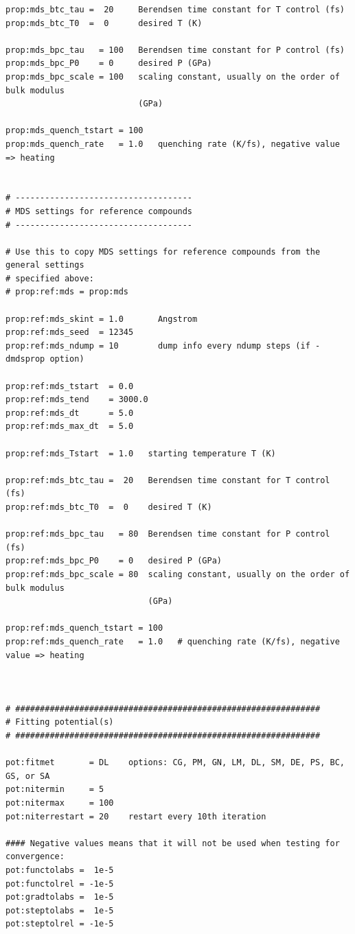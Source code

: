 \documentclass[a4paper,12pt,pdftex,onecolumn]{article}
\begin{document}
\begin{Verbatim}[fontsize=\relsize{-1},frame=single]
prop:mds_btc_tau =  20     Berendsen time constant for T control (fs)
prop:mds_btc_T0  =  0      desired T (K)

prop:mds_bpc_tau   = 100   Berendsen time constant for P control (fs)
prop:mds_bpc_P0    = 0     desired P (GPa)
prop:mds_bpc_scale = 100   scaling constant, usually on the order of bulk modulus
                           (GPa)

prop:mds_quench_tstart = 100
prop:mds_quench_rate   = 1.0   quenching rate (K/fs), negative value => heating


# ------------------------------------
# MDS settings for reference compounds
# ------------------------------------

# Use this to copy MDS settings for reference compounds from the general settings
# specified above:
# prop:ref:mds = prop:mds

prop:ref:mds_skint = 1.0       Angstrom
prop:ref:mds_seed  = 12345
prop:ref:mds_ndump = 10        dump info every ndump steps (if -dmdsprop option)

prop:ref:mds_tstart  = 0.0
prop:ref:mds_tend    = 3000.0
prop:ref:mds_dt      = 5.0
prop:ref:mds_max_dt  = 5.0

prop:ref:mds_Tstart  = 1.0   starting temperature T (K)

prop:ref:mds_btc_tau =  20   Berendsen time constant for T control (fs)
prop:ref:mds_btc_T0  =  0    desired T (K)

prop:ref:mds_bpc_tau   = 80  Berendsen time constant for P control (fs)
prop:ref:mds_bpc_P0    = 0   desired P (GPa)
prop:ref:mds_bpc_scale = 80  scaling constant, usually on the order of bulk modulus
                             (GPa)

prop:ref:mds_quench_tstart = 100
prop:ref:mds_quench_rate   = 1.0   # quenching rate (K/fs), negative value => heating



# ##############################################################
# Fitting potential(s)
# ##############################################################

pot:fitmet       = DL    options: CG, PM, GN, LM, DL, SM, DE, PS, BC, GS, or SA
pot:nitermin     = 5
pot:nitermax     = 100
pot:niterrestart = 20    restart every 10th iteration

#### Negative values means that it will not be used when testing for convergence:
pot:functolabs =  1e-5
pot:functolrel = -1e-5
pot:gradtolabs =  1e-5
pot:steptolabs =  1e-5
pot:steptolrel = -1e-5


\end{Verbatim}
\end{document}
